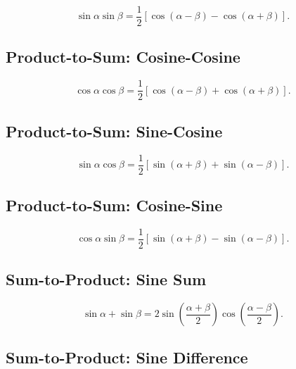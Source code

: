 \[
\boxed{
\sin\alpha\sin\beta
=
\frac12
\left[
\cos(\alpha-\beta)
-
\cos(\alpha+\beta)
\right].
}
\]

\subsection{Product-to-Sum: Cosine-Cosine}
\label{subsec:product-to-sum-cos-cos}

\[
\boxed{
\cos\alpha\cos\beta
=
\frac12
\left[
\cos(\alpha-\beta)
+
\cos(\alpha+\beta)
\right].
}
\]

\subsection{Product-to-Sum: Sine-Cosine}
\label{subsec:product-to-sum-sine-cosine}

\[
\boxed{
\sin\alpha\cos\beta
=
\frac12
\left[
\sin(\alpha+\beta)
+
\sin(\alpha-\beta)
\right].
}
\]

\subsection{Product-to-Sum: Cosine-Sine}
\label{subsec:product-to-sum-cosine-sine}

\[
\boxed{
\cos\alpha\sin\beta
=
\frac12
\left[
\sin(\alpha+\beta)
-
\sin(\alpha-\beta)
\right].
}
\]

\subsection{Sum-to-Product: Sine Sum}
\label{subsec:sum-to-product-sine-sum}

\[
\boxed{
\sin\alpha+\sin\beta
=
2
\sin
\left(
\frac{\alpha+\beta}{2}
\right)
\cos
\left(
\frac{\alpha-\beta}{2}
\right).
}
\]

\subsection{Sum-to-Product: Sine Difference}
\label{subsec:sum-to-product-sine-difference}

